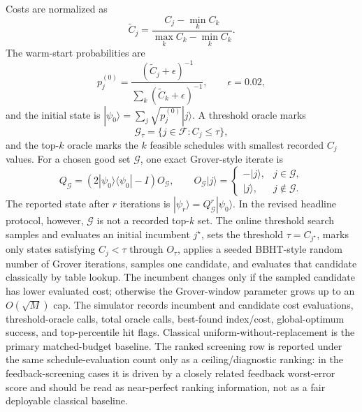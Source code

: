 \documentclass[preprint,12pt]{elsarticle}
\begin{document}
Costs are normalized as
\begin{equation}
\tilde{C}_j=\frac{C_j-\min_k C_k}{\max_k C_k-\min_k C_k}.
\end{equation}
The warm-start probabilities are
\begin{equation}
p_j^{(0)}=\frac{(\tilde{C}_j+\epsilon)^{-1}}{\sum_k(\tilde{C}_k+\epsilon)^{-1}},
\qquad \epsilon=0.02,
\end{equation}
and the initial state is $|\psi_0\rangle=\sum_j \sqrt{p_j^{(0)}}|j\rangle$. A threshold oracle marks
\begin{equation}
\mathcal{G}_\tau=\{j\in\mathcal{F}: C_j\leq \tau\},
\end{equation}
and the top-$k$ oracle marks the $k$ feasible schedules with smallest recorded $C_j$ values. For a chosen good set $\mathcal{G}$, one exact Grover-style iterate is
\begin{equation}
Q_\mathcal{G}=(2|\psi_0\rangle\langle\psi_0|-I)O_\mathcal{G},
\qquad
O_\mathcal{G}|j\rangle =
\begin{cases}
-|j\rangle, & j\in\mathcal{G},\\
|j\rangle, & j\notin\mathcal{G}.
\end{cases}
\end{equation}
The reported state after $r$ iterations is $|\psi_r\rangle=Q_\mathcal{G}^r|\psi_0\rangle$. In the revised headline protocol, however, $\mathcal{G}$ is not a recorded top-$k$ set. The online threshold search samples and evaluates an initial incumbent $j^\star$, sets the threshold $\tau=C_{j^\star}$, marks only states satisfying $C_j<\tau$ through $O_\tau$, applies a seeded BBHT-style random number of Grover iterations, samples one candidate, and evaluates that candidate classically by table lookup. The incumbent changes only if the sampled candidate has lower evaluated cost; otherwise the Grover-window parameter grows up to an $O(\sqrt{M})$ cap. The simulator records incumbent and candidate cost evaluations, threshold-oracle calls, total oracle calls, best-found index/cost, global-optimum success, and top-percentile hit flags. Classical uniform-without-replacement is the primary matched-budget baseline. The ranked screening row is reported under the same schedule-evaluation count only as a ceiling/diagnostic ranking: in the feedback-screening cases it is driven by a closely related feedback worst-error score and should be read as near-perfect ranking information, not as a fair deployable classical baseline.
\end{document}
